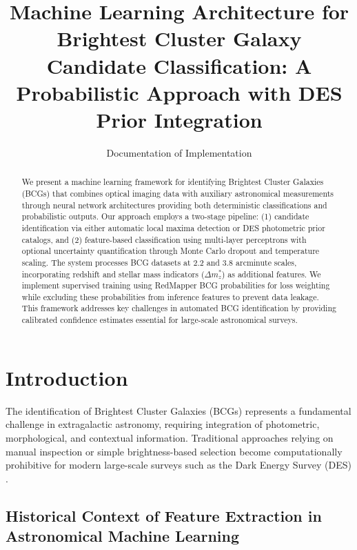 \documentclass[twocolumn,10pt]{aastex631}
\begin{document}
\title{Machine Learning Architecture for Brightest Cluster Galaxy Candidate Classification: A Probabilistic Approach with DES Prior Integration}

\author{Documentation of Implementation}

\begin{abstract}
We present a machine learning framework for identifying Brightest Cluster Galaxies (BCGs) that combines optical imaging data with auxiliary astronomical measurements through neural network architectures providing both deterministic classifications and probabilistic outputs. Our approach employs a two-stage pipeline: (1) candidate identification via either automatic local maxima detection or DES photometric prior catalogs, and (2) feature-based classification using multi-layer perceptrons with optional uncertainty quantification through Monte Carlo dropout and temperature scaling. The system processes BCG datasets at 2.2 and 3.8 arcminute scales, incorporating redshift and stellar mass indicators ($\Delta m^*_z$) as additional features. We implement supervised training using RedMapper BCG probabilities for loss weighting while excluding these probabilities from inference features to prevent data leakage. This framework addresses key challenges in automated BCG identification by providing calibrated confidence estimates essential for large-scale astronomical surveys.
\end{abstract}


\section{Introduction}

The identification of Brightest Cluster Galaxies (BCGs) represents a fundamental challenge in extragalactic astronomy, requiring integration of photometric, morphological, and contextual information. Traditional approaches relying on manual inspection or simple brightness-based selection become computationally prohibitive for modern large-scale surveys such as the Dark Energy Survey (DES) \citep{Rykoff2016}.

\subsection{Historical Context of Feature Extraction in Astronomical Machine Learning}
\end{document}
